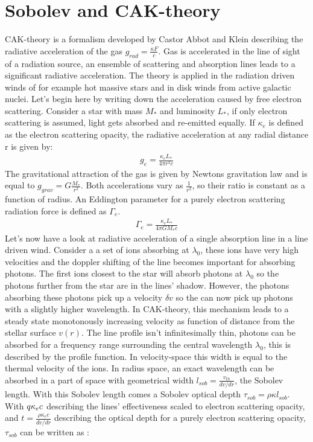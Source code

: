 \section{Sobolev and CAK-theory} \label{section: introduction CAK}
CAK-theory is a formalism developed by Castor Abbot and Klein \citep{CAK1975} describing the radiative acceleration of the gas $g_{rad} = \frac{\kappa F}{c}$. Gas is accelerated in the line of sight of a radiation source, an ensemble of scattering and absorption lines leads to a significant radiative acceleration. The theory is applied in the radiation driven winds of for example hot massive stars and in disk winds from active galactic nuclei. Let's begin here by writing down the acceleration caused by free electron scattering. Consider a star with mass $M_*$ and luminosity $L_*$, if only electron scattering is assumed, light gets absorbed and re-emitted equally. If $\kappa_e$ is defined as the electron scattering opacity, the radiative acceleration at any radial distance r is given by:
\begin{align}
g_e = \frac{\kappa_e L_*}{4 \pi r^2 c}
\end{align}
The gravitational attraction of the gas is given by Newtons gravitation law and is equal to $g_{grav} = G\frac{M_*}{r^2}$. Both accelerations vary as $\frac{1}{r^2}$, so their ratio is constant as a function of radius. An Eddington parameter for a purely electron scattering radiation force is defined as $\Gamma_e$.
\begin{align}
\Gamma_e = \frac{\kappa_e L_*}{4 \pi G M_* c}
\end{align}
Let's now have a look at radiative acceleration of a single absorption line in a line driven wind. Consider a a set of ions absorbing at $\lambda_0$, these ions have very high velocities and the doppler shifting of the line becomes important for absorbing photons. The first ions closest to the star will absorb photons at $\lambda_0$ so the photons further from the star are in the lines' shadow. However, the photons absorbing these photons pick up a velocity $\delta v$ so the can now pick up photons with a slightly higher wavelength. In CAK-theory, this mechanism leads to a steady state monotonously increasing velocity as function of distance from the stellar surface $v(r)$. The line profile isn't infinitesimally thin, photons can be absorbed for a frequency range surrounding the central wavelength $\lambda_0$, this is described by the profile function. In velocity-space this width is equal to the thermal velocity of the ions. In radius space, an exact wavelength can be absorbed in a part of space with geometrical width $l_{sob} = \frac{v_{th}}{dv/dr}$, the Sobolev length. With this Sobolev length comes a Sobolev optical depth $\tau_{sob} = \rho \kappa l_{sob}$. With $q \def \frac{\kappa v_{th}}{\kappa_e c}$ describing the lines' effectiveness scaled to electron scattering opacity, and $t = \frac{\rho \kappa_e c}{dv/dr}$ describing the optical depth for a purely electron scattering opacity, $\tau_{sob}$ can be written as \citep{Owocki2003}:
